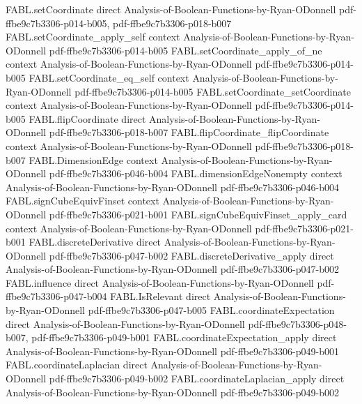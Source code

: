 \begin{theorem}
\proofstep
  {FABL.setCoordinate}
  {direct}
  {Analysis-of-Boolean-Functions-by-Ryan-ODonnell}
  {pdf-ffbe9c7b3306-p014-b005,
    pdf-ffbe9c7b3306-p018-b007}
\proofstep
  {FABL.setCoordinate_apply_self}
  {context}
  {Analysis-of-Boolean-Functions-by-Ryan-ODonnell}
  {pdf-ffbe9c7b3306-p014-b005}
\proofstep
  {FABL.setCoordinate_apply_of_ne}
  {context}
  {Analysis-of-Boolean-Functions-by-Ryan-ODonnell}
  {pdf-ffbe9c7b3306-p014-b005}
\proofstep
  {FABL.setCoordinate_eq_self}
  {context}
  {Analysis-of-Boolean-Functions-by-Ryan-ODonnell}
  {pdf-ffbe9c7b3306-p014-b005}
\proofstep
  {FABL.setCoordinate_setCoordinate}
  {context}
  {Analysis-of-Boolean-Functions-by-Ryan-ODonnell}
  {pdf-ffbe9c7b3306-p014-b005}
\proofstep
  {FABL.flipCoordinate}
  {direct}
  {Analysis-of-Boolean-Functions-by-Ryan-ODonnell}
  {pdf-ffbe9c7b3306-p018-b007}
\proofstep
  {FABL.flipCoordinate_flipCoordinate}
  {context}
  {Analysis-of-Boolean-Functions-by-Ryan-ODonnell}
  {pdf-ffbe9c7b3306-p018-b007}
\proofstep
  {FABL.DimensionEdge}
  {context}
  {Analysis-of-Boolean-Functions-by-Ryan-ODonnell}
  {pdf-ffbe9c7b3306-p046-b004}
\proofstep
  {FABL.dimensionEdgeNonempty}
  {context}
  {Analysis-of-Boolean-Functions-by-Ryan-ODonnell}
  {pdf-ffbe9c7b3306-p046-b004}
\proofstep
  {FABL.signCubeEquivFinset}
  {context}
  {Analysis-of-Boolean-Functions-by-Ryan-ODonnell}
  {pdf-ffbe9c7b3306-p021-b001}
\proofstep
  {FABL.signCubeEquivFinset_apply_card}
  {context}
  {Analysis-of-Boolean-Functions-by-Ryan-ODonnell}
  {pdf-ffbe9c7b3306-p021-b001}
\proofstep
  {FABL.discreteDerivative}
  {direct}
  {Analysis-of-Boolean-Functions-by-Ryan-ODonnell}
  {pdf-ffbe9c7b3306-p047-b002}
\proofstep
  {FABL.discreteDerivative_apply}
  {direct}
  {Analysis-of-Boolean-Functions-by-Ryan-ODonnell}
  {pdf-ffbe9c7b3306-p047-b002}
\proofstep
  {FABL.influence}
  {direct}
  {Analysis-of-Boolean-Functions-by-Ryan-ODonnell}
  {pdf-ffbe9c7b3306-p047-b004}
\proofstep
  {FABL.IsRelevant}
  {direct}
  {Analysis-of-Boolean-Functions-by-Ryan-ODonnell}
  {pdf-ffbe9c7b3306-p047-b005}
\proofstep
  {FABL.coordinateExpectation}
  {direct}
  {Analysis-of-Boolean-Functions-by-Ryan-ODonnell}
  {pdf-ffbe9c7b3306-p048-b007,
    pdf-ffbe9c7b3306-p049-b001}
\proofstep
  {FABL.coordinateExpectation_apply}
  {direct}
  {Analysis-of-Boolean-Functions-by-Ryan-ODonnell}
  {pdf-ffbe9c7b3306-p049-b001}
\proofstep
  {FABL.coordinateLaplacian}
  {direct}
  {Analysis-of-Boolean-Functions-by-Ryan-ODonnell}
  {pdf-ffbe9c7b3306-p049-b002}
\proofstep
  {FABL.coordinateLaplacian_apply}
  {direct}
  {Analysis-of-Boolean-Functions-by-Ryan-ODonnell}
  {pdf-ffbe9c7b3306-p049-b002}

\end{theorem}
